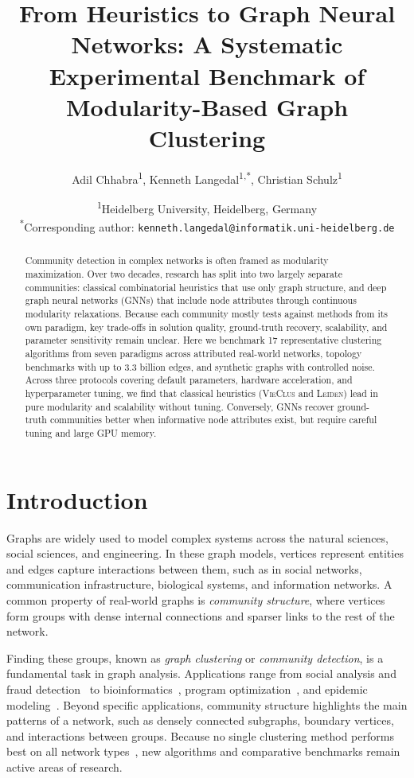 \documentclass[11pt,a4paper]{article}
\title{\textbf{From Heuristics to Graph Neural Networks: A Systematic Experimental Benchmark of Modularity-Based Graph Clustering}}
\author{
  Adil Chhabra\textsuperscript{1},
  Kenneth Langedal\textsuperscript{1,*},
  Christian Schulz\textsuperscript{1}
}
\date{
  \small
  \textsuperscript{1}Heidelberg University, Heidelberg, Germany\\
  \textsuperscript{*}Corresponding author: \texttt{kenneth.langedal@informatik.uni-heidelberg.de}
}
\begin{document}
\linenumbers

\maketitle

\begin{abstract}
  \noindent
  Community detection in complex networks is often framed as modularity maximization. Over two decades, research has split into two largely separate communities: classical combinatorial heuristics that use only graph structure, and deep graph neural networks (GNNs) that include node attributes through continuous modularity relaxations. Because each community mostly tests against methods from its own paradigm, key trade-offs in solution quality, ground-truth recovery, scalability, and parameter sensitivity remain unclear. Here we benchmark 17 representative clustering algorithms from seven paradigms across attributed real-world networks, topology benchmarks with up to 3.3 billion edges, and synthetic graphs with controlled noise. Across three protocols covering default parameters, hardware acceleration, and hyperparameter tuning, we find that classical heuristics (\textsc{VieClus} and \textsc{Leiden}) lead in pure modularity and scalability without tuning. Conversely, GNNs recover ground-truth communities better when informative node attributes exist, but require careful tuning and large GPU memory.
\end{abstract}

\section{Introduction}\label{sec:introduction}
Graphs are widely used to model complex systems across the natural sciences, social sciences, and engineering. In these graph models, vertices represent entities and edges capture interactions between them, such as in social networks, communication infrastructure, biological systems, and information networks. A common property of real-world graphs is \emph{community structure}, where vertices form groups with dense internal connections and sparser links to the rest of the network.

Finding these groups, known as \emph{graph clustering} or \emph{community detection}, is a fundamental task in graph analysis. Applications range from social analysis and fraud detection~\cite{Akoglu2015} to bioinformatics~\cite{Cai2011,Xu2002}, program optimization~\cite{Demme2012,McFarling89}, and epidemic modeling~\cite{Newman2003}. Beyond specific applications, community structure highlights the main patterns of a network, such as densely connected subgraphs, boundary vertices, and interactions between groups. Because no single clustering method performs best on all network types~\cite{Peel2016}, new algorithms and comparative benchmarks remain active areas of research.
\end{document}
